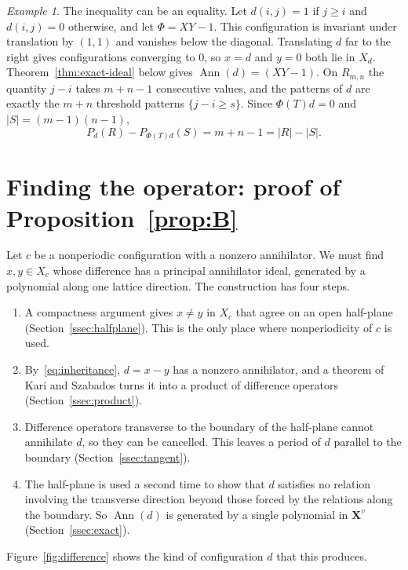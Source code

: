 \documentclass[11pt,a4paper,reqno]{amsart}
\theoremstyle{definition}
\theoremstyle{remark}
\newtheorem{example}[theorem]{Example}
\newcommand{\mon}[1]{\boldsymbol X^{#1}}
\DeclareMathOperator{\Ann}{Ann}
\numberwithin{equation}{section}
\begin{document}
\begin{example}\label{ex:sharp}
The inequality can be an equality. Let $d(i,j)=1$ if $j\ge i$ and $d(i,j)=0$ otherwise, and let $\Phi=XY-1$. This configuration is invariant under translation by $(1,1)$ and vanishes below the diagonal. Translating $d$ far to the right gives configurations converging to $0$, so $x=d$ and $y=0$ both lie in $X_d$. Theorem~\ref{thm:exact-ideal} below gives $\Ann(d)=(XY-1)$. On $R_{m,n}$ the quantity $j-i$ takes $m+n-1$ consecutive values, and the patterns of $d$ are exactly the $m+n$ threshold patterns $\{j-i\ge s\}$. Since $\Phi(T)d=0$ and $|S|=(m-1)(n-1)$,
\[
 P_d(R)-P_{\Phi(T)d}(S)=m+n-1=|R|-|S|.
\]
\end{example}

\section{Finding the operator: proof of Proposition~\ref{prop:B}}\label{sec:filter}

Let $c$ be a nonperiodic configuration with a nonzero annihilator. We must find $x,y\in X_c$ whose difference has a principal annihilator ideal, generated by a polynomial along one lattice direction. The construction has four steps.
\begin{enumerate}
\item A compactness argument gives $x\ne y$ in $X_c$ that agree on an open half-plane (Section~\ref{ssec:halfplane}). This is the only place where nonperiodicity of $c$ is used.
\item By~\eqref{eq:inheritance}, $d=x-y$ has a nonzero annihilator, and a theorem of Kari and Szabados turns it into a product of difference operators (Section~\ref{ssec:product}).
\item Difference operators transverse to the boundary of the half-plane cannot annihilate $d$, so they can be cancelled. This leaves a period of $d$ parallel to the boundary (Section~\ref{ssec:tangent}).
\item The half-plane is used a second time to show that $d$ satisfies no relation involving the transverse direction beyond those forced by the relations along the boundary. So $\Ann(d)$ is generated by a single polynomial in $\mon v$ (Section~\ref{ssec:exact}).
\end{enumerate}
Figure~\ref{fig:difference} shows the kind of configuration $d$ that this produces.
\end{document}
